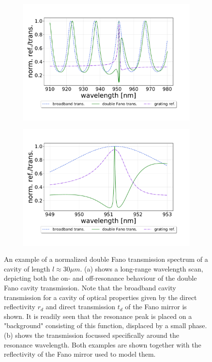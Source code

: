 \begin{figure}[h!]
    \centering
    \begin{subfigure}[c]{0.49\textwidth}
        \centering
        \includegraphics[width=\textwidth]{figures/double_fano_full_range_30um.pdf}
        \caption{}
        \label{fig:double_full_range}
    \end{subfigure}
    \begin{subfigure}[c]{0.49\textwidth}
        \includegraphics[width=\textwidth]{figures/double_fano_short_range_30um.pdf}
        \caption{}
        \label{fig:double_short_range}
    \end{subfigure}
    \caption{An example of a normalized double Fano transmission spectrum of a cavity of length $l \approx 30 \mu m$. (a) shows a long-range wavelength scan, depicting both the on- and off-resonance behaviour of the double Fano cavity transmission. Note that the broadband cavity transmission for a cavity of optical properties given by the direct reflectivity $r_d$ and direct transmission $t_d$ of the Fano mirror is shown. It is readily seen that the resonance peak is placed on a "background" consisting of this function, displaced by a small phase. (b) shows the transmission focussed specifically around the resonance wavelength. Both examples are shown together with the reflectivity of the Fano mirror used to model them.}
    \label{fig:double_fano_transmission}
\end{figure}


